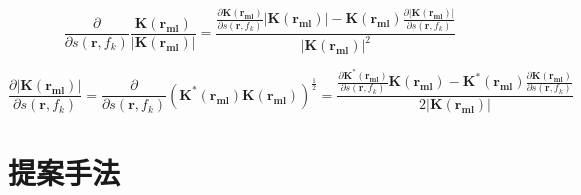 \documentclass[12pt,a4paper]{jsreport}
\begin{document}

  \begin{equation}
    \frac{\partial}{\partial s(\bm{r},f_{k})} \frac{\bm{K({\bm{r_{ml}}})}}{|\bm{K({\bm{r_{ml}}})}|}
    = \frac{ \frac{\partial \bm{K(\bm{r_{ml}})} }{\partial s(\bm{r},f_{k})}|\bm{K({\bm{r_{ml}}})}|  - 
      \bm{K({\bm{r_{ml}}})}\frac{\partial |\bm{K(\bm{r_{ml}})}| }{\partial s(\bm{r},f_{k})}}{|\bm{K({\bm{r_{ml}}})}|^2}
        \label{正規化hの微分}
    \end{equation}

    \begin{equation}
      \frac{\partial |\bm{K({\bm{r_{ml}}})}|}{\partial s(\bm{r},f_{k})} 
      = \frac{\partial}{\partial s(\bm{r},f_{k})}(\bm{K^{*}({\bm{r_{ml}}})}\bm{K({\bm{r_{ml}}})})^{\frac{1}{2}}
      = \frac{ \frac{\partial \bm{K^{*}(\bm{r_{ml}})} }{\partial s(\bm{r},f_{k})}\bm{K({\bm{r_{ml}}})}  - 
      \bm{K^{*}({\bm{r_{ml}}})}\frac{\partial \bm{K(\bm{r_{ml}})} }{\partial s(\bm{r},f_{k})}}{2|\bm{K({\bm{r_{ml}}})}|}
          \label{絶対値kの微分}
      \end{equation}

  

\chapter{提案手法}
\end{document}
